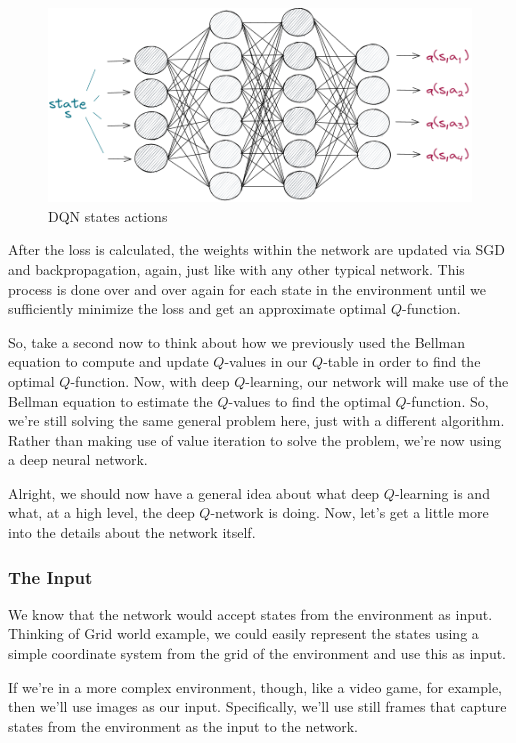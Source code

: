 \begin{figure}[h]
\centering
\includegraphics[scale=0.618]{pix/q_learning/q_network.png}
\caption{DQN states actions}
\end{figure}

After the loss is calculated, the weights within the network are updated via SGD and 
backpropagation, again, just like with any other typical network. This process is done 
over and over again for each state in the environment until we sufficiently minimize 
the loss and get an approximate optimal $Q$-function.

So, take a second now to think about how we previously used the Bellman equation to 
compute and update $Q$-values in our $Q$-table in order to find the optimal $Q$-function. 
Now, with deep $Q$-learning, our network will make use of the Bellman equation to estimate 
the $Q$-values to find the optimal $Q$-function. So, we're still solving the same general 
problem here, just with a different algorithm. Rather than making use of value iteration 
to solve the problem, we're now using a deep neural network.

Alright, we should now have a general idea about what deep $Q$-learning is and what, at 
a high level, the deep $Q$-network is doing. Now, let's get a little more into the details 
about the network itself.


\subsubsection{The Input}

We know that the network would accept states from the environment as input. Thinking of 
Grid world example, we could easily represent the states using a simple coordinate system 
from the grid of the environment and use this as input.

If we're in a more complex environment, though, like a video game, for example, then 
we'll use images as our input. Specifically, we'll use still frames that capture states 
from the environment as the input to the network.

